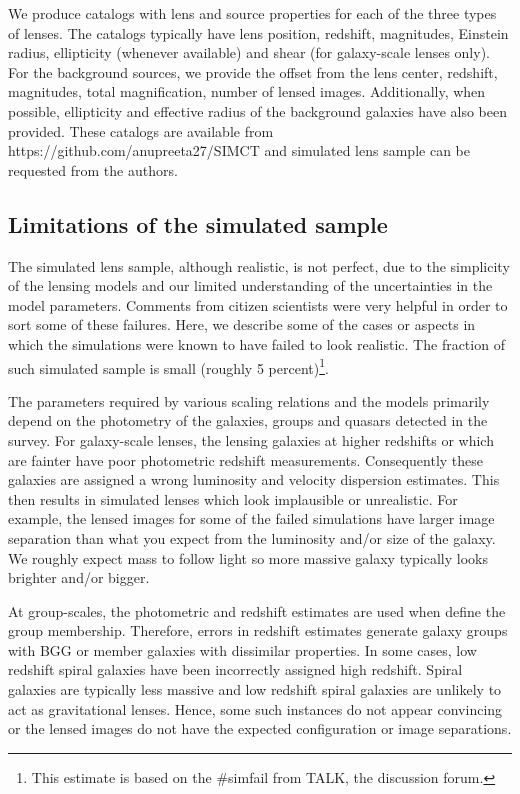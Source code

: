 \documentclass[useAMS,usenatbib,a4paper]{mn2e}
\begin{document}
We produce catalogs with lens and source properties for each of the
three types of lenses.  The catalogs typically have lens position,
redshift, magnitudes, Einstein radius, ellipticity (whenever available)
and shear (for galaxy-scale lenses only). For the background sources, we
provide the offset from the lens center, redshift, magnitudes, total
magnification, number of lensed images. Additionally, when possible,
ellipticity and effective radius of the background galaxies have also
been provided. These catalogs are available from
https://github.com/anupreeta27/SIMCT and simulated lens sample can be
requested from the authors.


\subsection{Limitations of the simulated sample}
The simulated lens sample, although realistic, is not perfect, due to
the simplicity of the lensing models and our limited understanding of
the uncertainties in the model parameters. Comments from citizen
scientists were very helpful in order to sort some of these failures.
Here, we describe some of the cases or aspects in which the simulations
were known to have failed to look realistic. The fraction of such
simulated sample is small (roughly 5 percent)\footnote{This estimate is
based on the \#simfail from TALK, the discussion forum.}.

The parameters required by various scaling relations and the models
primarily depend on the photometry of the galaxies, groups and quasars
detected in the survey. For galaxy-scale lenses, the lensing galaxies at
higher redshifts or which are fainter have poor photometric redshift
measurements. Consequently these galaxies are assigned a wrong
luminosity and velocity dispersion estimates. This then results in
simulated lenses which look implausible or unrealistic.  For example,
the lensed images for some of the failed simulations have larger image
separation than what you expect from the luminosity and/or size of the
galaxy. We roughly expect mass to follow light so more massive galaxy
typically looks brighter and/or bigger.

At group-scales, the photometric and redshift estimates are used when define
the group membership. Therefore, errors in redshift estimates generate galaxy
groups with BGG or member galaxies with dissimilar properties. In some cases,
low redshift spiral galaxies have been incorrectly assigned high redshift.
Spiral galaxies are typically less massive and low redshift spiral galaxies are
unlikely to act as gravitational lenses. Hence, some such instances
do not appear convincing or the lensed images do not have the expected
configuration or image separations.
\end{document}
